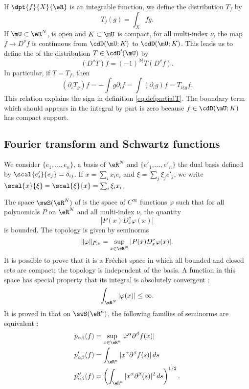 If $\dpt{f}{X}{\eR}$ is an integrable function, we define the distribution $T_f$ by 
\[ 
  T_j(g)=\int_Xfg.
\]
If $\mU\subset\eR^N$, is open and $K\subset\mU$ is compact, for all multi-index $\nu$, the map $f\to D^{\nu}f$ is continuous from $\cdD(\mU;K)$ to $\cdD(\mU;K)$. This leads us to define the  of the distribution $T\in\cdD'(\mU)$ by
\begin{equation} \label{eq:defpartialT}
  (D^{\nu}T)f=(-1)^{| \nu |}T(D^{\nu}f).
\end{equation}
In particular, if $T=T_f$, then
\begin{equation} \label{eq:defTpri}
(\partial_iT_g)f=-\int g\partial_if
                =\int(\partial_ig)f
                =T_{\partial_ig}f.
\end{equation}
This relation explains the sign in definition \eqref{eq:defpartialT}. The boundary term which should appears in the integral by part is zero because $f\in\cdD(\mU;K)$ has compact support.

\subsection{Fourier transform and Schwartz functions}

We consider $\{ e_1,\ldots,e_n \}$, a basis of $\eR^N$ and $\{ e'_1,\ldots,e'_n \}$ the dual basis defined by $\scal{e'_i}{e_j}=\delta_{ij}$. If $x=\sum_ix_ie_i$ and $\xi=\sum_j\xi_je'_j$, we write $\scal{x}{\xi}=\scal{\xi}{x}=\sum_i\xi_ix_i$.

The space $\swS(\eR^N)$\label{not_swS} of  is the space of $ C^{\infty}$ functions $\varphi$ such that for all polynomials $P$ on $\eR^N$ and all multi-index $\nu$, the quantity
\begin{equation}
  | P(x)D_x^{\nu}\varphi(x) |
\end{equation}
is bounded.  The topology is given by seminorms
\begin{equation}
  \| \varphi \|_{P,\nu}=\sup_{x\in\eR^N}| P(x)D_x^{\nu}\varphi(x) |.
\end{equation}
It is possible to prove that it is a Fréchet space in which all bounded and closed sets are compact; the topology is independent of the basis. A function in this space has special property that its integral is absolutely convergent :
\[ 
  \int_{\eR^N}| \varphi(x) |\leq \infty.
\]
It is proved in \cite{Kirillov} that on $\swS(\eR^n)$, the following families of seminorms are equivalent :
\begin{subequations}
\begin{align}
  p_{\alpha\beta}(f)&=\sup_{x\in\eR^n}| x^{\alpha}\partial^{\beta}f(x) |\\
 p'_{\alpha\beta}(f)&=\int_{\eR^n}| x^{\alpha}\partial^{\beta}f(s) |\,ds\\
p''_{\alpha\beta}(f)&=\left( \int_{\eR^n}| x^{\alpha}\partial^{\beta}(s) |^2\,ds \right)^{1/2}.
\end{align}
\end{subequations}

